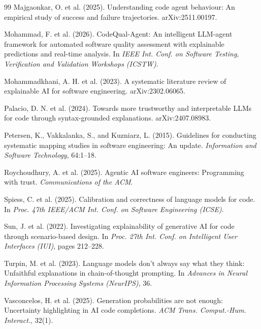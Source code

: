 \documentclass[12pt]{article}
\begin{document}
\begin{thebibliography}{99}
Majgaonkar, O. et al. (2025). Understanding code agent behaviour: An empirical
study of success and failure trajectories. arXiv:2511.00197.

Mohammad, F. et al. (2026). CodeQual-Agent: An intelligent LLM-agent framework
for automated software quality assessment with explainable predictions and
real-time analysis. In \textit{IEEE Int. Conf. on Software Testing, Verification
and Validation Workshops (ICSTW)}.

Mohammadkhani, A. H. et al. (2023). A systematic literature review of explainable
AI for software engineering. arXiv:2302.06065.

Palacio, D. N. et al. (2024). Towards more trustworthy and interpretable LLMs for
code through syntax-grounded explanations. arXiv:2407.08983.

Petersen, K., Vakkalanka, S., and Kuzniarz, L. (2015). Guidelines for conducting
systematic mapping studies in software engineering: An update.
\textit{Information and Software Technology}, 64:1--18.

Roychoudhury, A. et al. (2025). Agentic AI software engineers: Programming with
trust. \textit{Communications of the ACM}.

Spiess, C. et al. (2025). Calibration and correctness of language models for
code. In \textit{Proc. 47th IEEE/ACM Int. Conf. on Software Engineering (ICSE)}.

Sun, J. et al. (2022). Investigating explainability of generative AI for code
through scenario-based design. In \textit{Proc. 27th Int. Conf. on Intelligent
User Interfaces (IUI)}, pages 212--228.

Turpin, M. et al. (2023). Language models don't always say what they think:
Unfaithful explanations in chain-of-thought prompting. In \textit{Advances in
Neural Information Processing Systems (NeurIPS)}, 36.

Vasconcelos, H. et al. (2025). Generation probabilities are not enough:
Uncertainty highlighting in AI code completions. \textit{ACM Trans.
Comput.-Hum. Interact.}, 32(1).


\end{thebibliography}
\end{document}
